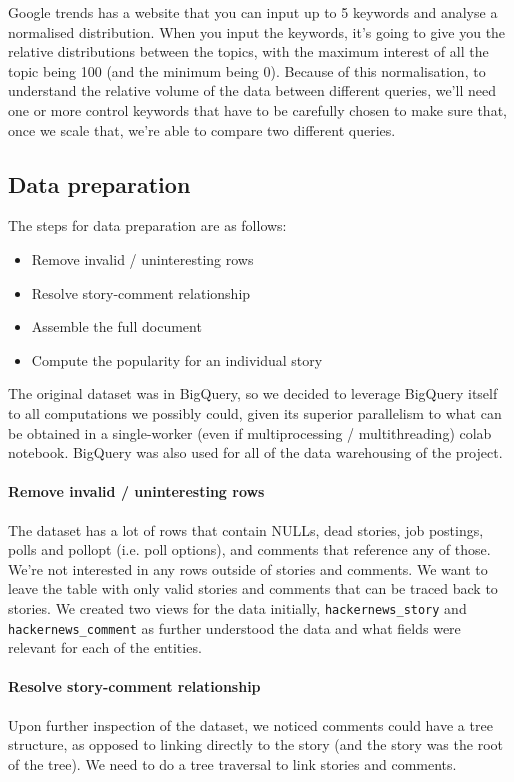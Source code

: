 \documentclass[nonacm,sigconf]{acmart}
\begin{document}
Google trends has a website that you can input up to 5 keywords and analyse a normalised distribution. When you input the keywords, it's going to give you the relative distributions between the topics, with the maximum interest of all the topic being 100 (and the minimum being 0). Because of this normalisation, to understand the relative volume of the data between different queries, we'll need one or more control keywords that have to be carefully chosen to make sure that, once we scale that, we're able to compare two different queries.

\subsection{Data preparation}

The steps for data preparation are as follows:

\begin{itemize}
    \item Remove invalid / uninteresting rows
    \item Resolve story-comment relationship
    \item Assemble the full document
    \item Compute the popularity for an individual story
\end{itemize}

The original dataset was in BigQuery, so we decided to leverage BigQuery itself to all computations we possibly could, given its superior parallelism to what can be obtained in a single-worker (even if multiprocessing / multithreading) colab notebook. BigQuery was also used for all of the data warehousing of the project.

\paragraph{Remove invalid / uninteresting rows} The dataset has a lot of rows that contain NULLs, dead stories, job postings, polls and pollopt (i.e. poll options), and comments that reference any of those. We're not interested in any rows outside of stories and comments. We want to leave the table with only valid stories and comments that can be traced back to stories. We created two views for the data initially, \texttt{hackernews\_story} and \texttt{hackernews\_comment} as further understood the data and what fields were relevant for each of the entities.
\paragraph{Resolve story-comment relationship} Upon further inspection of the dataset, we noticed comments could have a tree structure, as opposed to linking directly to the story (and the story was the root of the tree). We need to do a tree traversal to link stories and comments.
\end{document}

